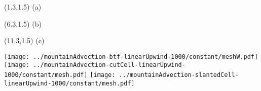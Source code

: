 \documentclass{article}
\begin{document}
\TPMargin{2pt}
\begin{textblock}{0.55}(1.3,1.5)
\normalsize
(a)
\end{textblock}
\begin{textblock}{0.55}(6.3,1.5)
\normalsize
(b)
\end{textblock}
\begin{textblock}{0.55}(11.3,1.5)
\normalsize
(c)
\end{textblock}
\texttt{[image: ../mountainAdvection-btf-linearUpwind-1000/constant/meshW.pdf]}
\texttt{[image: ../mountainAdvection-cutCell-linearUpwind-1000/constant/mesh.pdf]}
\texttt{[image: ../mountainAdvection-slantedCell-linearUpwind-1000/constant/mesh.pdf]}
\end{document}
